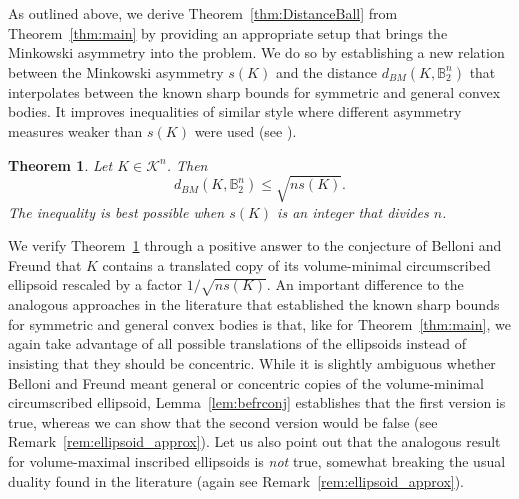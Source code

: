 \documentclass{amsart}
\newtheorem{theorem}{Theorem}[section]
\newcommand\B{\mathbb{B}}
\newcommand\CK{\mathcal{K}}
\begin{document}
As outlined above, we derive Theorem~\ref{thm:DistanceBall} from Theorem~\ref{thm:main} by providing an appropriate setup that brings the Minkowski asymmetry into the problem.
We do so by establishing
a new relation between the Minkowski asymmetry $s(K)$ and the distance $d_{BM}(K,\B_2^n)$ that interpolates between the known sharp bounds for symmetric and general convex bodies.
It improves inequalities of similar style where different asymmetry measures weaker than $s(K)$ were used (see \cite{2008:BelloniFreund, 2015:BrandenbergKönig}).



\begin{theorem}\label{thm:AsymmetryDistance}
Let $K\in\CK^n$. Then
\[
    d_{BM}(K,\B_2^n)
    \leq \sqrt{n s(K)}.
\]
The inequality is best possible when $s(K)$ is an integer that divides $n$.
\end{theorem}

We verify Theorem~\ref{thm:AsymmetryDistance} through a positive answer to the conjecture of Belloni and Freund \cite[Remark~4]{2008:BelloniFreund} that $K$ contains a translated copy of its volume-minimal circumscribed ellipsoid rescaled by a factor $1/\sqrt{n s(K)}$.
An important difference to the analogous approaches in the literature that established the known sharp bounds for symmetric and general convex bodies is that, like for Theorem~\ref{thm:main}, we again take advantage of all possible translations of the ellipsoids instead of insisting that they should be concentric.
While it is slightly ambiguous whether Belloni and Freund
meant general or concentric
copies of the volume-minimal circumscribed ellipsoid,
Lemma~\ref{lem:befrconj} establishes that the first version is true,
whereas we can show that the second version would be false
(see Remark~\ref{rem:ellipsoid_approx}).
Let us also point out that the analogous result for volume-maximal inscribed ellipsoids is \emph{not} true,
somewhat breaking the usual duality found in the literature
(again see Remark~\ref{rem:ellipsoid_approx}).
\end{document}
